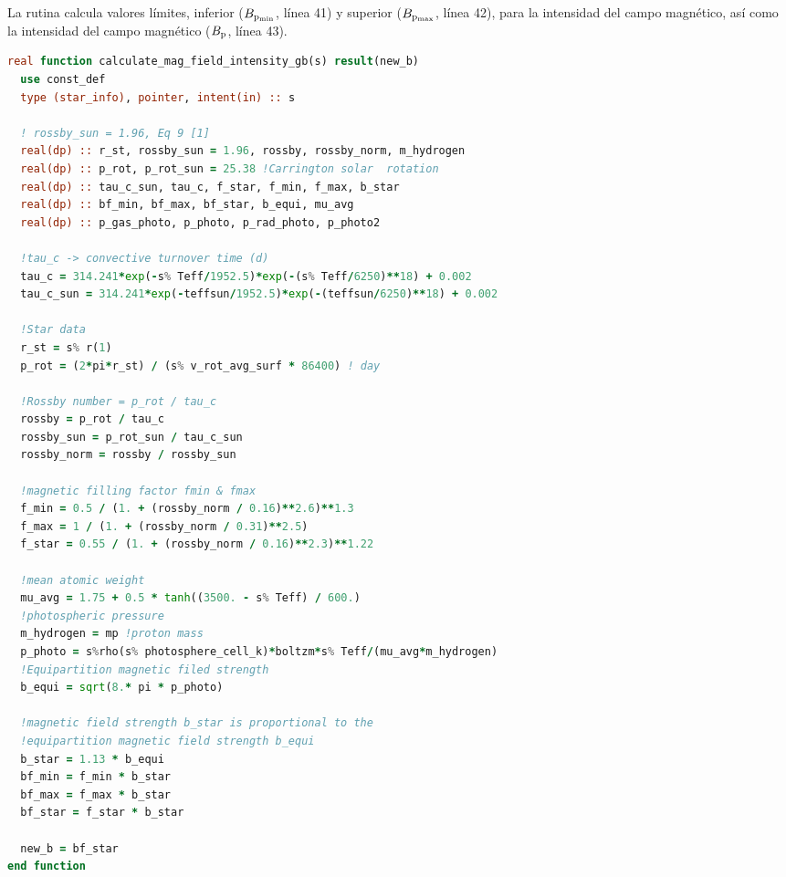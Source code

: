 La rutina calcula valores límites, inferior ($B_{\mathrm{p_{min}}}$, línea 41) y superior ($B_{\mathrm{p_{max}}}$, línea 42), para la intensidad del campo magnético, así como la intensidad del campo magnético ($B_{\mathrm{p}}$, línea 43).

\begin{lstlisting}[language=Fortran, float, caption={Rutina de cálculo de intensidad variable de campo magnético.}, label={lst:jdot_mf_intensity}]
real function calculate_mag_field_intensity_gb(s) result(new_b)
  use const_def
  type (star_info), pointer, intent(in) :: s
	
  ! rossby_sun = 1.96, Eq 9 [1]
  real(dp) :: r_st, rossby_sun = 1.96, rossby, rossby_norm, m_hydrogen
  real(dp) :: p_rot, p_rot_sun = 25.38 !Carrington solar  rotation
  real(dp) :: tau_c_sun, tau_c, f_star, f_min, f_max, b_star
  real(dp) :: bf_min, bf_max, bf_star, b_equi, mu_avg
  real(dp) :: p_gas_photo, p_photo, p_rad_photo, p_photo2
	
  !tau_c -> convective turnover time (d)
  tau_c = 314.241*exp(-s% Teff/1952.5)*exp(-(s% Teff/6250)**18) + 0.002 
  tau_c_sun = 314.241*exp(-teffsun/1952.5)*exp(-(teffsun/6250)**18) + 0.002
	
  !Star data
  r_st = s% r(1)
  p_rot = (2*pi*r_st) / (s% v_rot_avg_surf * 86400) ! day
	
  !Rossby number = p_rot / tau_c
  rossby = p_rot / tau_c
  rossby_sun = p_rot_sun / tau_c_sun
  rossby_norm = rossby / rossby_sun
	
  !magnetic filling factor fmin & fmax
  f_min = 0.5 / (1. + (rossby_norm / 0.16)**2.6)**1.3 
  f_max = 1 / (1. + (rossby_norm / 0.31)**2.5)
  f_star = 0.55 / (1. + (rossby_norm / 0.16)**2.3)**1.22
	
  !mean atomic weight
  mu_avg = 1.75 + 0.5 * tanh((3500. - s% Teff) / 600.)
  !photospheric pressure 
  m_hydrogen = mp !proton mass       
  p_photo = s%rho(s% photosphere_cell_k)*boltzm*s% Teff/(mu_avg*m_hydrogen)
  !Equipartition magnetic filed strength
  b_equi = sqrt(8.* pi * p_photo)
	
  !magnetic field strength b_star is proportional to the
  !equipartition magnetic field strength b_equi
  b_star = 1.13 * b_equi
  bf_min = f_min * b_star
  bf_max = f_max * b_star
  bf_star = f_star * b_star
	
  new_b = bf_star
end function
\end{lstlisting}

